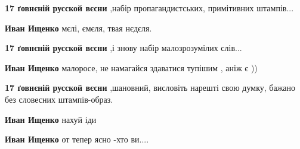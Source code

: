\begin{itemize}
\begin{itemize}
\begin{itemize}
\textbf{17 ґовнєній русской вєсни} ,набір пропагандистських, примітивних штампів...

 
\textbf{Иван Ищенко} мєлі, ємєля, твая нєдєля.

 
\textbf{17 ґовнєній русской вєсни} ,і знову набір малозрозумілих слів...

 
\textbf{Иван Ищенко} малоросе, не намагайся здаватися тупішим , аніж є ))

 
\textbf{17 ґовнєній русской вєсни} ,шановний, висловіть нарешті свою думку, бажано без словесних штампів-образ.

 
\textbf{Иван Ищенко} нахуй іди

 
\textbf{Иван Ищенко} от тепер ясно -хто ви....


\end{itemize}
\end{itemize}
\end{itemize}
